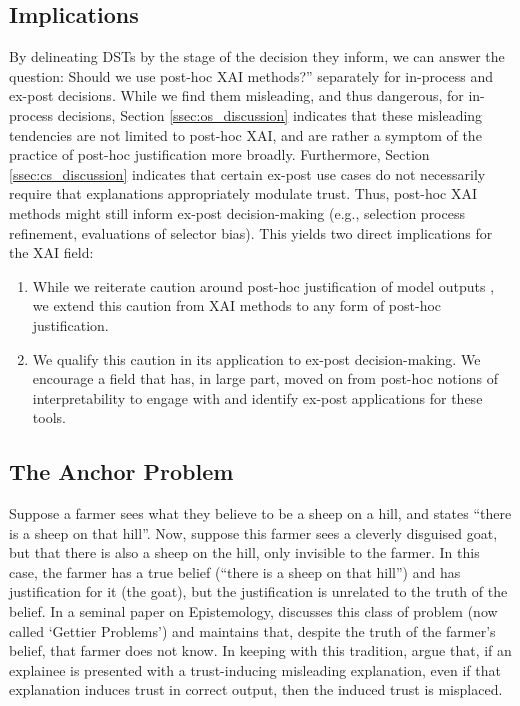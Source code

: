 \subsection{Implications}
By delineating DSTs by the stage of the decision they inform, we can answer the question: Should we use post-hoc XAI methods?'' separately for in-process and ex-post decisions. While we find them misleading, and thus dangerous, for in-process decisions, Section \ref{ssec:os_discussion} indicates that these misleading tendencies are not limited to post-hoc XAI, and are rather a symptom of the practice of post-hoc justification more broadly. Furthermore, Section \ref{ssec:cs_discussion} indicates that certain ex-post use cases do not necessarily require that explanations appropriately modulate trust. Thus, post-hoc XAI methods might still inform ex-post decision-making (e.g., selection process refinement, evaluations of selector bias). This yields two direct implications for the XAI field:

\begin{enumerate}
    \item While we reiterate caution around post-hoc justification of model outputs \cite{miller_explainable_2023, Lipton, bansal_does_2021, ford_play_2020, jacobs_how_2021}, we extend this caution from XAI methods to any form of post-hoc justification.
    \item We qualify this caution in its application to ex-post decision-making. We encourage a field that has, in large part, moved on from post-hoc notions of interpretability \cite{kumar_problems_2020,barocas_hidden_2020,Lipton,karimi_algorithmic_2021} to engage with and identify ex-post applications for these tools.
\end{enumerate}

\subsection{The Anchor Problem}\label{ssec:anchor_problem}


Suppose a farmer sees what they believe to be a sheep on a hill, and states ``there is a sheep on that hill''. Now, suppose this farmer sees a cleverly disguised goat, but that there is also a sheep on the hill, only invisible to the farmer. In this case, the farmer has a true belief (``there is a sheep on that hill'') and has justification for it (the goat), but the justification is unrelated to the truth of the belief. In a seminal paper on Epistemology, \textcite{Gettier_1963} discusses this class of problem (now called `Gettier Problems') and maintains that, despite the truth of the farmer's belief, that farmer does not know. In keeping with this tradition, \textcite{Cabitza_Fregosi_Campagner_Natali_2024} argue that, if an explainee is presented with a trust-inducing misleading explanation, even if that explanation induces trust in correct output, then the induced trust is misplaced.

